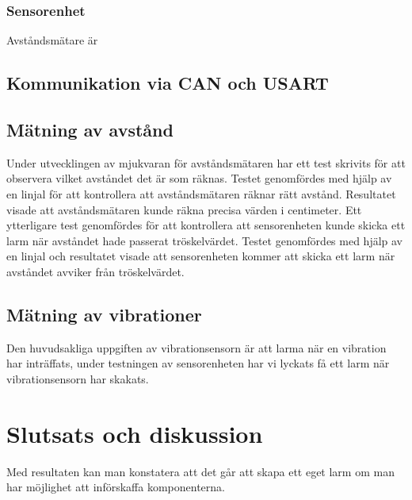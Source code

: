 \documentclass{article}
\begin{document}
\subsubsection{Sensorenhet}
Avståndsmätare är 

\subsection{Kommunikation via CAN och USART}

\subsection{Mätning av avstånd}
Under utvecklingen av mjukvaran för avståndsmätaren har ett test skrivits för att observera vilket avståndet det är som räknas. 
Testet genomfördes med hjälp av en linjal för att kontrollera att avståndsmätaren räknar rätt avstånd. 
Resultatet visade att avståndsmätaren kunde räkna precisa värden i centimeter. 
Ett ytterligare test genomfördes för att kontrollera att sensorenheten kunde skicka ett larm när avståndet hade passerat tröskelvärdet. 
Testet genomfördes med hjälp av en linjal och resultatet visade att sensorenheten kommer att skicka ett larm när avståndet avviker från tröskelvärdet.

\subsection{Mätning av vibrationer}
Den huvudsakliga uppgiften av vibrationsensorn är att larma när en vibration har inträffats, under testningen av sensorenheten har vi lyckats få ett larm när vibrationsensorn har skakats.


\section{Slutsats och diskussion}
Med resultaten kan man konstatera att det går att skapa ett eget larm om man har möjlighet att införskaffa komponenterna.\\
\end{document}
